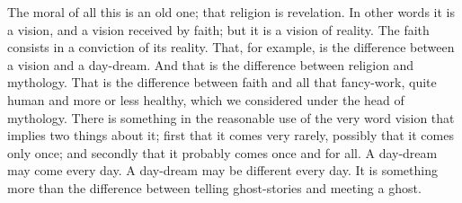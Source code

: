 The moral of all this is an old one; that religion is revelation. In other words it is a vision, and a vision received by faith; but it is a vision of reality. The faith consists in a conviction of its reality. That, for example, is the difference between a vision and a day-dream. And that is the difference between religion and mythology. That is the difference between faith and all that fancy-work, quite human and more or less healthy, which we considered under the head of mythology. There is something in the reasonable use of the very word vision that implies two things about it; first that it comes very rarely, possibly that it comes only once; and secondly that it probably comes once and for all. A day-dream may come every day. A day-dream may be different every day. It is something more than the difference between telling ghost-stories and meeting a ghost.

